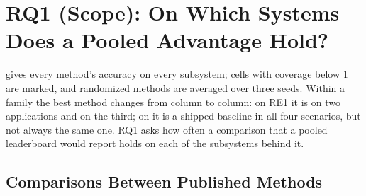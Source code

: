 \section{RQ1 (Scope): On Which Systems Does a Pooled Advantage Hold?}
\label{sec:rq1}

 gives every method's accuracy on every subsystem; cells with coverage below 1 are marked, and randomized methods are averaged over three seeds.
Within a family the best method changes from column to column: on RE1 it is \baro on two applications and \cdmin on the third; on \petshop it is a shipped baseline in all four scenarios, but not always the same one.
RQ1 asks how often a comparison that a pooled leaderboard would report holds on each of the subsystems behind it.

\begin{table}[t]
\caption{Accuracy (\acc; \openrca: official partial score) of every method on every subsystem, over all cases (invalid outputs score 0). $^\dagger$: coverage below 1. Bold: best in column. --: the method does not run there (\cref{sec:design-methods}). \rcd and \causalrca: mean of three seeds (\petshop's own \rcd: one run).}
\label{tab:main}
\footnotesize

\end{table}

\subsection{Comparisons Between Published Methods}
\label{sec:rq1-pub}

